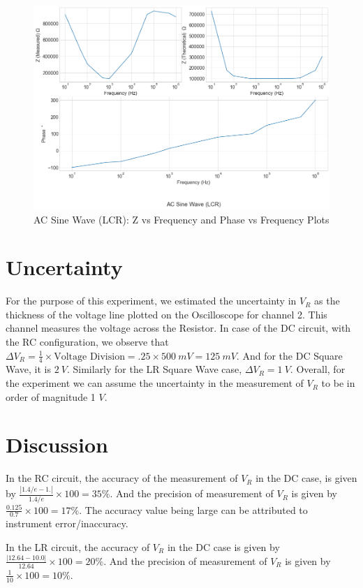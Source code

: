 \documentclass[a4paper,12pt]{article}
\begin{document}
\begin{figure}[H]
  \centering
  \includegraphics[width=0.8\linewidth]{../code/AC Sine Wave (LCR).png}    
    \caption{AC Sine Wave (LCR): Z vs Frequency and Phase vs Frequency Plots}
    \label{Combined_LCR_AC}
\end{figure}

\section{Uncertainty}

For the purpose of this experiment, we estimated the uncertainty in $V_R$
as the thickness of the voltage line plotted on the Oscilloscope for channel 2. This channel 
measures the voltage across the Resistor. In case of the DC circuit, with the RC configuration, we observe that 
$\Delta V_R = \frac{1}{4} \times \text{Voltage Division} = .25 \times 500\ mV = 125\ mV$. 
And for the DC Square Wave, it is $2\ V$. Similarly for the LR Square Wave case, $\Delta V_R = 1\ V$.
Overall, for the experiment we can assume the uncertainty in the measurement of $V_R$ to be 
in order of magnitude 1 $V$.

\section{Discussion}

In the RC circuit, the accuracy of the measurement of $V_R$ in the DC case, is given by $\frac{|1.4/e - 1.|}{1.4/e} \times 100 = 35 \%$. 
And the precision of measurement of $V_R$ is given by $\frac{0.125}{0.7} \times 100 = 17 \%$. 
The accuracy value being large can be attributed to instrument error/inaccuracy.

In the LR circuit, the accuracy of $V_R$ in the DC case is given by $\frac{|12.64 - 10.0|}{12.64} \times 100 = 20 \%$. 
And the precision of measurement of $V_R$ is given by $\frac{1}{10} \times 100 = 10 \%$. 
\end{document}
